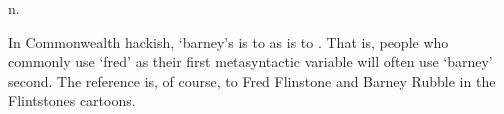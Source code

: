  n.

In Commonwealth hackish, `barney's is to  as 
is to . That is, people who commonly use `fred' as their first
metasyntactic variable will often use `barney' second. The reference is, of
course, to Fred Flinstone and Barney Rubble in the Flintstones cartoons.

